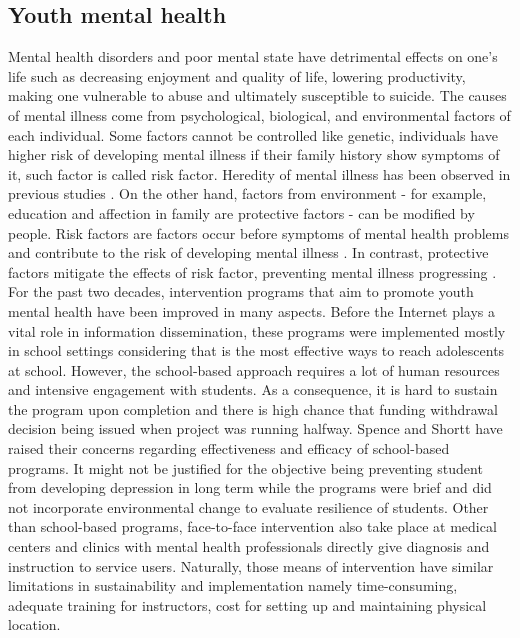 \subsection*{Youth mental health}
Mental health disorders and poor mental state have detrimental effects on one's life such as decreasing enjoyment and quality of life, lowering productivity, making one vulnerable to abuse and ultimately susceptible to suicide. The causes of mental illness come from psychological, biological, and environmental factors of each individual. Some factors cannot be controlled like genetic, individuals have higher risk of developing mental illness if their family history show symptoms of it, such factor is called risk factor. Heredity of mental illness has been observed in previous studies \cite{Hyman2000}. On the other hand, factors from environment - for example, education and affection in family are protective factors - can be modified by people. Risk factors are factors occur before symptoms of mental health problems and contribute to the risk of developing mental illness \cite{KAZDIN1997375}. In contrast, protective factors mitigate the effects of risk factor, preventing mental illness progressing \cite{shortt_spence_2006}. \\

For the past two decades, intervention programs that aim to promote youth mental health have been improved in many aspects. Before the Internet plays a vital role in information dissemination, these programs were implemented mostly in school settings considering that is the most effective ways to reach adolescents at school. However, the school-based approach requires a lot of human resources and intensive engagement with students. As a consequence, it is hard to sustain the program upon completion and there is high chance that funding withdrawal decision being issued when project was running halfway. Spence and Shortt \cite{JCPP:JCPP1738} have raised their concerns regarding effectiveness and efficacy of school-based programs. It might not be justified for the objective being preventing student from developing depression in long term while the programs were brief and did not incorporate environmental change to evaluate resilience of students. Other than school-based programs, face-to-face intervention also take place at medical centers and clinics with mental health professionals directly give diagnosis and instruction to service users. Naturally, those means of intervention have similar limitations in sustainability and implementation namely time-consuming, adequate training for instructors, cost for setting up and maintaining physical location.\\

